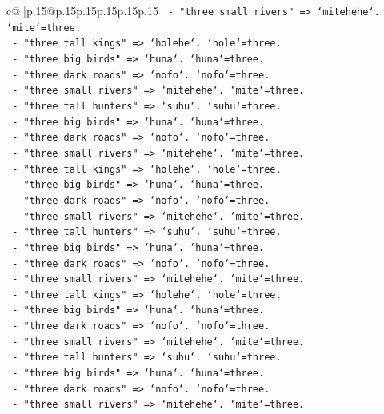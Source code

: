 \documentclass{article}
\begin{document}
{\begin{supertabular}{c@{$\;$}|p{.15\linewidth}@{}p{.15\linewidth}p{.15\linewidth}p{.15\linewidth}p{.15\linewidth}p{.15\linewidth}}
{{{\texttt{      {-} "three small rivers" => `mitehehe`. `mite`=three.} \\
\texttt{      {-} "three tall kings" => `holehe`. `hole`=three.} \\
\texttt{      {-} "three big birds" => `huna`. `huna`=three.} \\
\texttt{      {-} "three dark roads" => `nofo`. `nofo`=three.} \\
\texttt{      {-} "three small rivers" => `mitehehe`. `mite`=three.} \\
\texttt{      {-} "three tall hunters" => `suhu`. `suhu`=three.} \\
\texttt{      {-} "three big birds" => `huna`. `huna`=three.} \\
\texttt{      {-} "three dark roads" => `nofo`. `nofo`=three.} \\
\texttt{      {-} "three small rivers" => `mitehehe`. `mite`=three.} \\
\texttt{      {-} "three tall kings" => `holehe`. `hole`=three.} \\
\texttt{      {-} "three big birds" => `huna`. `huna`=three.} \\
\texttt{      {-} "three dark roads" => `nofo`. `nofo`=three.} \\
\texttt{      {-} "three small rivers" => `mitehehe`. `mite`=three.} \\
\texttt{      {-} "three tall hunters" => `suhu`. `suhu`=three.} \\
\texttt{      {-} "three big birds" => `huna`. `huna`=three.} \\
\texttt{      {-} "three dark roads" => `nofo`. `nofo`=three.} \\
\texttt{      {-} "three small rivers" => `mitehehe`. `mite`=three.} \\
\texttt{      {-} "three tall kings" => `holehe`. `hole`=three.} \\
\texttt{      {-} "three big birds" => `huna`. `huna`=three.} \\
\texttt{      {-} "three dark roads" => `nofo`. `nofo`=three.} \\
\texttt{      {-} "three small rivers" => `mitehehe`. `mite`=three.} \\
\texttt{      {-} "three tall hunters" => `suhu`. `suhu`=three.} \\
\texttt{      {-} "three big birds" => `huna`. `huna`=three.} \\
\texttt{      {-} "three dark roads" => `nofo`. `nofo`=three.} \\
\texttt{      {-} "three small rivers" => `mitehehe`. `mite`=three.} \\
}}}
\end{supertabular}}
\end{document}
